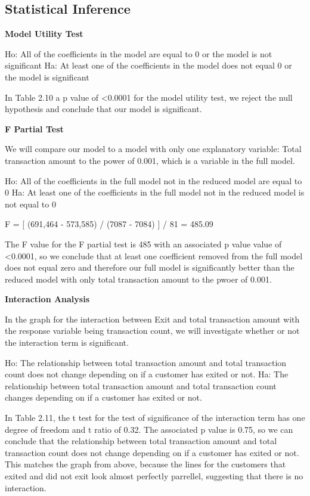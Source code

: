 \documentclass[
]{article}
\begin{document}
\hypertarget{statistical-inference-1}{%
\subsection{Statistical Inference}\label{statistical-inference-1}}

\textbf{Model Utility Test}

Ho: All of the coefficients in the model are equal to 0 or the model is
not significant Ha: At least one of the coefficients in the model does
not equal 0 or the model is significant

In Table 2.10 a p value of \textless0.0001 for the model utility test,
we reject the null hypothesis and conclude that our model is
significant.

\textbf{F Partial Test}

We will compare our model to a model with only one explanatory variable:
Total transaction amount to the power of 0.001, which is a variable in
the full model.

Ho: All of the coefficients in the full model not in the reduced model
are equal to 0 Ha: At least one of the coefficients in the full model
not in the reduced model is not equal to 0

F = {[} (691,464 - 573,585) / (7087 - 7084) {]} / 81 = 485.09

The F value for the F partial test is 485 with an associated p value
value of \textless0.0001, so we conclude that at least one coefficient
removed from the full model does not equal zero and therefore our full
model is significantly better than the reduced model with only total
transaction amount to the pwoer of 0.001.

\textbf{Interaction Analysis}

In the graph for the interaction between Exit and total transaction
amount with the response variable being transaction count, we will
investigate whether or not the interaction term is significant.

Ho: The relationship between total transaction amount and total
transaction count does not change depending on if a customer has exited
or not. Ha: The relationship between total transaction amount and total
transaction count changes depending on if a customer has exited or not.

In Table 2.11, the t test for the test of significance of the
interaction term has one degree of freedom and t ratio of 0.32. The
associated p value is 0.75, so we can conclude that the relationship
between total transaction amount and total transaction count does not
change depending on if a customer has exited or not. This matches the
graph from above, because the lines for the customers that exited and
did not exit look almost perfectly parrellel, suggesting that there is
no interaction.
\end{document}
